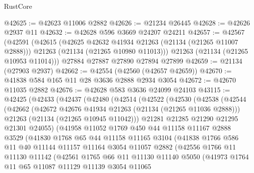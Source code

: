 \begin{lexlean}{RustCore}
\begin{coremodule}
@42625 := @42623 @11006 @2882
@42626 := @21234 @26445
@42628 := @42626 @2937 @11
@42632 := @42628 @596 @3669 @24207 @24211
@42657 := @42567
    (@42591
      (@42615
        (@42625 @42632 @41934 @21263 (@21134 (@21265 @11007 @2888)))
        @21263
        (@21134 (@21265 @10980 @11013)))
      @21263
      (@21134 (@21265 @10953 @11014)))
    @27884
    @27887
    @27890
    @27894
    @27899
@42659 := @21134 (@27903 @2937)
@42662 := @42554 (@42560 (@42657 @42659))
@42670 := @41838 @584 @165 @11 @28 @3636 @2888 @2934 @3054
@42672 := @42670 @11035 @2882
@42676 := @42628 @583 @3636 @24099 @24103
@43115 := @42425
    (@42433
      (@42437
        (@42480
          (@42514
            (@42522
              (@42530
                (@42538
                  (@42544
                    (@42662
                      (@42672 @42676 @41934 @21263 (@21134 (@21265 @11036 @2888)))
                      @21263
                      (@21134 (@21265 @10945 @11042)))
                    @21281
                    @21285
                    @21290
                    @21295
                    @21301
                    @24055)
                  (@41958
                    @11052
                    @1769
                    @450
                    @44
                    @11158
                    @11167
                    @2888
                    @3529
                    (@41830
                      @1768
                      @65
                      @44
                      @11158
                      @11165
                      @3104
                      (@41838
                        @1766
                        @586
                        @11
                        @40
                        @11144
                        @11157
                        @11164
                        @3054
                        @11057
                        @2882
                        (@42556
                          @1766
                          @11
                          @11130
                          @11142
                          (@42561
                            @1765
                            @66
                            @11
                            @11130
                            @11140
                            @5050
                            (@41973
                              @1764
                              @11
                              @65
                              @11087
                              @11129
                              @11139
                              @3054
                              @11065

\end{coremodule}
\end{lexlean}
